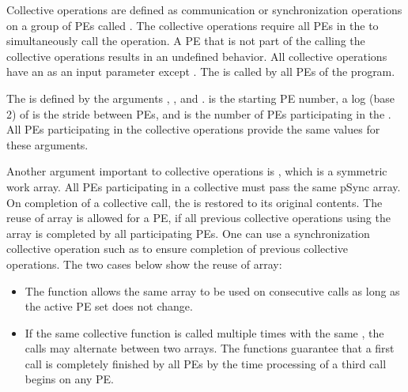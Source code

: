 
Collective operations are defined as communication or synchronization operations 
on a group of \ac{PE}s called \activeset{}. The collective operations require all
\ac{PE}s in the \activeset{} to simultaneously call the operation. 
A \ac{PE} that is not part of the \activeset{} calling the collective 
operations results in an undefined behavior.  All
collective operations have an \activeset{} as an input parameter except \barrierall{}. The \barrierall{} is called by all \ac{PE}s of the \openshmem{} program. 

The \activeset{} is defined by the arguments , , 
and .   is the starting \ac{PE} number, a log (base 2) of  is the stride between \ac{PE}s, and  is the number of \ac{PE}s participating in the \activeset{}.  All \ac{PE}s participating in the 
collective operations provide the same values for these arguments. 
 
Another argument important to collective operations is , which is a symmetric work array.  All \ac{PE}s participating in a collective must pass the same
pSync array.  On completion of a collective call, the  is restored to its 
original contents.  The reuse of  array is allowed for a \ac{PE}, if all previous collective operations using the  array is completed by all participating 
\ac{PE}s.  One can use a synchronization collective operation such as \barrier{}
to ensure completion of previous collective operations.  The two cases below
show the reuse of  array:

\begin{itemize}
\item The  function allows the same  array to be 		used on consecutive calls as long as the active \ac{PE} set does not change.
\item  If the same collective function is called multiple times with the
          same \activeset, the calls may alternate between two  arrays.
          The \openshmem functions guarantee that a first call is completely finished by 
          all \ac{PE}s by the time processing of a third  call  begins  on any \ac{PE}.          
\end{itemize}



